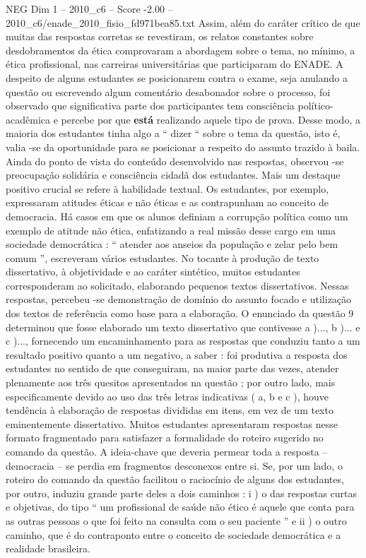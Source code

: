 \begin{textsample}{NEG Dim 1 – 2010\_c6 – Score -2.00 – 2010\_c6/enade\_2010\_fisio\_fd971bea85.txt}
Assim, além do caráter crítico de que muitas das respostas corretas se revestiram, os relatos constantes sobre desdobramentos da ética comprovaram a abordagem sobre o tema, no mínimo, a ética profissional, nas carreiras universitárias que participaram do ENADE.
A despeito de alguns estudantes se posicionarem contra o exame, seja anulando a questão ou escrevendo algum comentário desabonador sobre o processo, foi observado que significativa parte dos participantes tem consciência político-acadêmica e percebe por que \textbf{está} realizando aquele tipo de prova.
Desse modo, a maioria dos estudantes tinha algo a “ dizer “ sobre o tema da questão, isto é, valia -se da oportunidade para se posicionar a respeito do assunto trazido à baila.
Ainda do ponto de vista do conteúdo desenvolvido nas respostas, observou -se preocupação solidária e consciência cidadã dos estudantes.
Mais um destaque positivo crucial se refere à habilidade textual.
Os estudantes, por exemplo, expressaram atitudes éticas e não éticas e as contrapunham ao conceito de democracia.
Há casos em que os alunos definiam a corrupção política como um exemplo de atitude não ética, enfatizando a real missão desse cargo em uma sociedade democrática : “ atender aos anseios da população e zelar pelo bem comum ”, escreveram vários estudantes.
No tocante à produção de texto dissertativo, à objetividade e ao caráter sintético, muitos estudantes corresponderam ao solicitado, elaborando pequenos textos dissertativos.
Nessas respostas, percebeu -se demonstração de domínio do assunto focado e utilização dos textos de referência como base para a elaboração.
O enunciado da questão 9 determinou que fosse elaborado um texto dissertativo que contivesse a )..., b )... e c )..., fornecendo um encaminhamento para as respostas que conduziu tanto a um resultado positivo quanto a um negativo, a saber : foi produtiva a resposta dos estudantes no sentido de que conseguiram, na maior parte das vezes, atender plenamente aos três quesitos apresentados na questão ; por outro lado, mais especificamente devido ao uso das três letras indicativas ( a, b e c ), houve tendência à elaboração de respostas divididas em itens, em vez de um texto eminentemente dissertativo.
Muitos estudantes apresentaram respostas nesse formato fragmentado para satisfazer a formalidade do roteiro sugerido no comando da questão.
A ideia-chave que deveria permear toda a resposta – democracia – se perdia em fragmentos desconexos entre si.
Se, por um lado, o roteiro do comando da questão facilitou o raciocínio de alguns dos estudantes, por outro, induziu grande parte deles a dois caminhos : i ) o das respostas curtas e objetivas, do tipo “ um profissional de saúde não ético é aquele que conta para as outras pessoas o que foi feito na consulta com o seu paciente ” e ii ) o outro caminho, que é do contraponto entre o conceito de sociedade democrática e a realidade brasileira.

\end{textsample}
